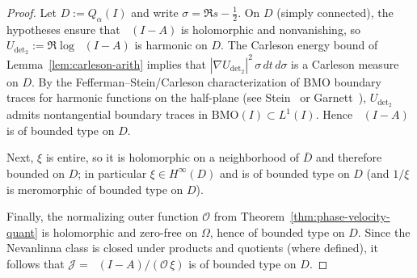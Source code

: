 \documentclass[11pt]{amsart}
\theoremstyle{definition}
\theoremstyle{remark}
\DeclareMathOperator{\dettwo}{det_2}
\begin{document}
\begin{proof}
Let $D:=Q_{\alpha}(I)$ and write $\sigma=\Re s-\tfrac12$.
On $D$ (simply connected), the hypotheses ensure that $\dettwo(I-A)$ is holomorphic and nonvanishing, so
\(
U_{\det_2}:=\Re\log\dettwo(I-A)
\)
is harmonic on $D$.
The Carleson energy bound of Lemma~\ref{lem:carleson-arith} implies that
\(
|\nabla U_{\det_2}|^2\,\sigma\,dt\,d\sigma
\)
is a Carleson measure on $D$.
By the Fefferman--Stein/Carleson characterization of BMO boundary traces for harmonic functions on the half-plane (see Stein~\cite[Ch.~IV]{SteinHA} or Garnett~\cite[Ch.~VI]{GarnettBAF}),
$U_{\det_2}$ admits nontangential boundary traces in $\mathrm{BMO}(I)\subset L^1(I)$.
Hence $\dettwo(I-A)$ is of bounded type on $D$.

Next, $\xi$ is entire, so it is holomorphic on a neighborhood of $\overline D$ and therefore bounded on $D$; in particular $\xi\in H^\infty(D)$ and is of bounded type on $D$ (and $1/\xi$ is meromorphic of bounded type on $D$).

Finally, the normalizing outer function $\mathcal O$ from Theorem~\ref{thm:phase-velocity-quant} is holomorphic and zero-free on $\Omega$, hence of bounded type on $D$.
Since the Nevanlinna class is closed under products and quotients (where defined), it follows that
\(
\mathcal J=\dettwo(I-A)/(\mathcal O\,\xi)
\)
is of bounded type on $D$.
\end{proof}
\end{document}
